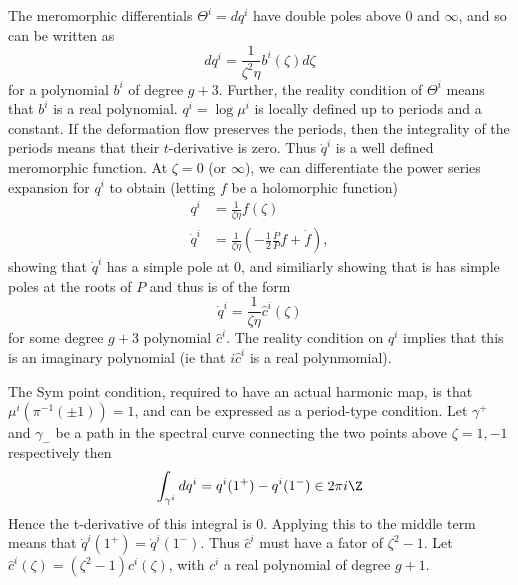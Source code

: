 The meromorphic differentials $Θ^i = dq^i$ have double poles above $0$ and $\infty$, and so can be written as
\[
dq^i = \frac{1}{\zeta^2\eta}b^i(\zeta) d\zeta
\]
for a polynomial $b^i$ of degree $g+3$. Further, the reality condition of $\Theta^i$ means that $b^i$ is a real polynomial. $q^i = \log \mu^i$ is locally defined up to periods and a constant. If the deformation flow preserves the periods, then the integrality of the periods means that their $t$-derivative is zero. Thus $\dot q^i$ is a well defined meromorphic function. At $ζ=0$ (or $\infty$), we can differentiate the power series expansion for $q^i$ to obtain (letting $f$ be a holomorphic function)
\begin{align*}
q^i &= \frac{1}{\zeta\eta}f(\zeta) \\
\dot q^i &= \frac{1}{\zeta\eta} \left(-\frac{1}{2}\frac{\dot P}{P}f + \dot f\right),
\end{align*}
showing that $\dot q^i$ has a simple pole at $0$, and similiarly showing that is has simple poles at the roots of $P$ and thus is of the form
\[
\dot{q}^i = \frac{1}{\zeta\eta}\hat c^i(\zeta)
\]
for some degree $g+3$ polynomial $\hat c^i$. The reality condition on $q^i$ implies that this is an imaginary polynomial (ie that $i \hat c^i$ is a real polynmomial).

The Sym point condition, required to have an actual harmonic map, is that $\mu^i(\pi^{-1}(\pm 1)) = 1$, and can be expressed as a period-type condition. Let $γ^+$ and $γ_-$ be a path in the spectral curve connecting the two points above $ζ=1,-1$ respectively then
\begin{align*}
\int_{\gamma^i} dq^i = q^i(1^+) - q^i(1^-) \in 2\pi i \Z
\end{align*}
Hence the t-derivative of this integral is 0. Applying this to the middle term means that $\dot q^i(1^+) = \dot q^i(1^-)$. Thus $\hat c^i$ must have a fator of $\zeta^2-1$. Let $\hat c^i(\zeta) = (\zeta^2 - 1) c^i(\zeta)$, with $c^i$ a real polynomial of degree $g+1$.


